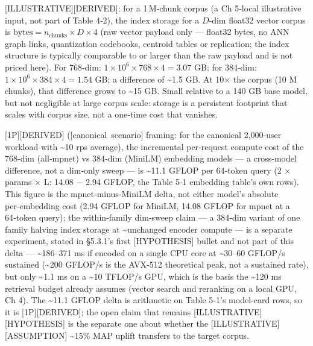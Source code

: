 \mbox{{[}ILLUSTRATIVE{]}}\hspace{0pt}\mbox{{[}DERIVED{]}}: for a 1\,M‑chunk corpus (a Ch 5‑local
illustrative input, not part of Table 4‑2), the index storage for a
\(D\)‑dim float32 vector corpus is
\(\text{bytes} = n_\text{chunks} \times D \times 4\) (raw vector payload
only --- float32 bytes, no ANN graph links, quantization codebooks,
centroid tables or replication; the index structure is typically
comparable to or larger than the raw payload and is not priced here).
For 768‑dim: \(1{\times}10^6 \times 768 \times 4 = 3.07\) GB; for
384‑dim: \(1{\times}10^6 \times 384 \times 4 = 1.54\) GB; a difference
of \textasciitilde1.5 GB. At 10× the corpus (10 M chunks), that
difference grows to \textasciitilde15 GB. Small relative to a 140 GB
base model, but not negligible at large corpus scale: storage is a
persistent footprint that scales with corpus size, not a one‑time cost
that vanishes.

\mbox{{[}1P{]}}\hspace{0pt}\mbox{{[}DERIVED{]}} (\mbox{{[}canonical scenario{]}} framing: for the
canonical 2,000‑user workload with \textasciitilde10 rps average), the
incremental per‑request compute cost of the 768‑dim (all‑mpnet) vs
384‑dim (MiniLM) embedding models --- a cross‑model difference, not a
dim‑only sweep --- is \textasciitilde11.1 GFLOP per 64‑token query (2 ×
params × L: 14.08 − 2.94 GFLOP, the Table 5‑1 embedding table's own
rows). This figure is the mpnet‑minus‑MiniLM delta, not either model's
absolute per‑embedding cost (2.94 GFLOP for MiniLM, 14.08 GFLOP for
mpnet at a 64‑token query); the within‑family dim‑sweep claim --- a
384‑dim variant of one family halving index storage at
\textasciitilde unchanged encoder compute --- is a separate experiment,
stated in §5.3.1's first \mbox{{[}HYPOTHESIS{]}} bullet and not part of this
delta --- \textasciitilde186--371 ms if encoded on a single CPU core at
\textasciitilde30--60 GFLOP/s sustained (\textasciitilde200 GFLOP/s is
the AVX‑512 theoretical peak, not a sustained rate), but only
\textasciitilde1.1 ms on a \textasciitilde10 TFLOP/s GPU, which is the
basis the \textasciitilde120 ms retrieval budget already assumes (vector
search and reranking on a local GPU, Ch 4). The \textasciitilde11.1
GFLOP delta is arithmetic on Table 5‑1's model-card rows, so it is
\mbox{{[}1P{]}}\hspace{0pt}\mbox{{[}DERIVED{]}}; the open claim that remains
\mbox{{[}ILLUSTRATIVE{]}}\hspace{0pt}\mbox{{[}HYPOTHESIS{]}} is the separate one about whether the
\mbox{{[}ILLUSTRATIVE{]}}\hspace{0pt}\mbox{{[}ASSUMPTION{]}} \textasciitilde15\% MAP uplift
transfers to the target corpus.

